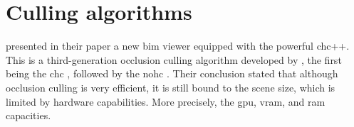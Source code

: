 \section{Culling algorithms}\label{sec:historyCulling}
\cite{Johansson2015} presented in their paper a new \ac{bim} viewer equipped with the powerful \ac{chc}++. This is a third-generation occlusion culling algorithm developed by \cite{Mattausch2008}, the first being the \ac{chc} \parencite{Bittner2004}, followed by the \ac{nohc} \parencite{Michael2006}. Their conclusion stated that although occlusion culling is very efficient, it is still bound to the scene size, which is limited by hardware capabilities. More precisely, the \ac{gpu}, \ac{vram}, and \ac{ram} capacities.